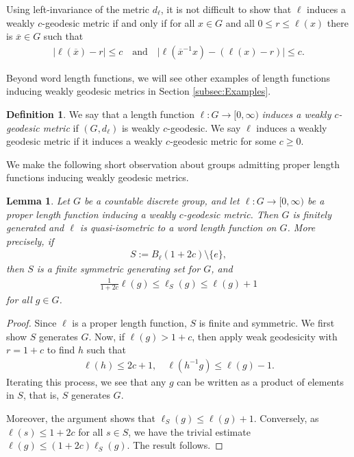 \documentclass[12pt,a4paper,oneside,final,reqno]{amsart}
\theoremstyle{plain}
\newtheorem{lemma}[theorem]{Lemma}
\theoremstyle{definition}
\newtheorem{definition}[theorem]{Definition}
\begin{document}
    Using left-invariance of the metric $d_\ell$, it is not difficult to show that $\ell$ induces a weakly $c$-geodesic metric if and only if for all $x \in G$ and all $0 \leq r \leq \ell(x)$ there is $\overline{x} \in G$ such that
\begin{align}\label{eq:c-weak-geodesic-conditions}
    \vert \ell(\overline{x}) - r \vert \leq c \quad \text{and} \quad \vert \ell(\overline{x}^{-1}x) - (\ell(x) - r) \vert \leq c.
\end{align}
 
Beyond word length functions, we will see other examples of length functions inducing weakly geodesic metrics in Section \ref{subsec:Examples}. 

\begin{definition}\label{def:weakly-geodesic-length-function}
    We say that a length function $\ell \colon G \to [0,\infty)$ \emph{induces a weakly $c$-geodesic metric} if $(G,d_\ell)$ is weakly $c$-geodesic. We say $\ell$ induces a weakly geodesic metric if it induces a weakly $c$-geodesic metric for some $c \geq 0$. 
\end{definition}

We make the following short observation about groups admitting proper length functions inducing weakly geodesic metrics. 

\begin{lemma}\label{lemma:proper-weak-geodesic-is-fin-gen}
    Let $G$ be a countable discrete group, and let $\ell \colon G \to [0,\infty)$ be a proper length function inducing a weakly $c$-geodesic metric. Then $G$ is finitely generated and $\ell$ is quasi-isometric to a word length function on $G$. More precisely, if
    \begin{align*}
        S:=B_\ell(1+2c)\setminus\{e\},
    \end{align*}
    then $S$ is a finite symmetric generating set for $G$, and
    \begin{align*}
        \frac{1}{1+2c}\ell(g)\leq \ell_S(g)\leq \ell(g)+1
    \end{align*}
    for all $g \in G$.
\end{lemma}
\begin{proof}
    Since $\ell$ is a proper length function, $S$ is finite and symmetric. We first show $S$ generates $G$. 
    Now, if $\ell(g) > 1+c$, then apply weak geodesicity with $r = 1+c$ to find $h$ such that
    \begin{align*}
        \ell(h) \leq 2c+1 , \quad \ell(h^{-1}g) \leq \ell(g) -1.
    \end{align*}
    Iterating this process, we see that any $g$ can be written as a product of elements in $S$, that is, $S$ generates $G$. 
    
    Moreover, the argument shows that $\ell_S(g) \leq \ell(g) +1$. Conversely, as $\ell(s) \leq 1+2c$ for all $s \in S$, we have the trivial estimate $\ell(g) \leq (1+2c) \ell_S(g)$. 
    The result follows. 
\end{proof}
\end{document}
